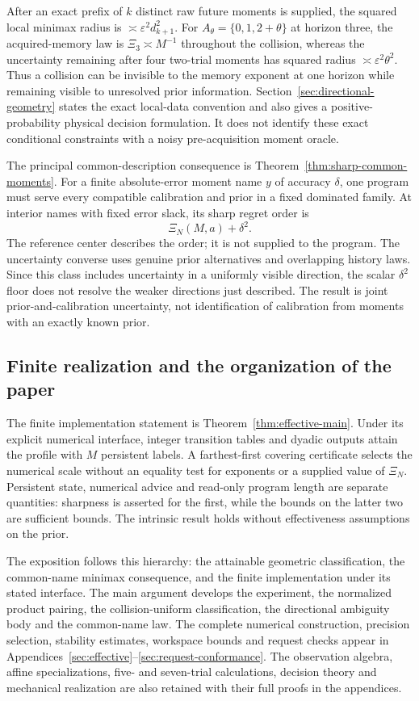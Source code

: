 After an exact prefix of $k$ distinct raw future moments is supplied,
the squared local minimax radius is
$\asymp\varepsilon^2d_{k+1}^2$. For
$A_\theta=\{0,1,2+\theta\}$ at horizon three, the acquired-memory law
is $\Xi_3\asymp M^{-1}$ throughout the collision, whereas the
uncertainty remaining after four two-trial moments has squared radius
$\asymp\varepsilon^2\theta^2$. Thus a collision can be invisible to
the memory exponent at one horizon while remaining visible to unresolved
prior information. Section~\ref{sec:directional-geometry} states the
exact local-data convention and also gives a positive-probability
physical decision formulation. It does not identify these exact
conditional constraints with a noisy pre-acquisition moment oracle.

The principal common-description consequence is
Theorem~\ref{thm:sharp-common-moments}. For a finite absolute-error
moment name $y$ of accuracy $\delta$, one program must serve every
compatible calibration and prior in a fixed dominated family. At
interior names with fixed error slack, its sharp regret order is
\[
 \Xi_N(M,a)+\delta^2.
\]
The reference center describes the order; it is not supplied to the
program. The uncertainty converse uses genuine prior alternatives and
overlapping history laws. Since this class includes uncertainty in a
uniformly visible direction, the scalar $\delta^2$ floor does not
resolve the weaker directions just described. The result is joint
prior-and-calibration uncertainty, not identification of calibration
from moments with an exactly known prior.

\subsection{Finite realization and the organization of the paper}
The finite implementation statement is Theorem~\ref{thm:effective-main}.
Under its explicit numerical interface, integer transition tables and
dyadic outputs attain the profile with $M$ persistent labels. A
farthest-first covering certificate selects the numerical scale without
an equality test for exponents or a supplied value of $\Xi_N$.
Persistent state, numerical advice and read-only program length are
separate quantities: sharpness is asserted for the first, while the
bounds on the latter two are sufficient bounds. The intrinsic result
holds without effectiveness assumptions on the prior.

The exposition follows this hierarchy: the attainable geometric
classification, the common-name minimax consequence, and the finite
implementation under its stated interface. The main argument develops
the experiment, the normalized product pairing, the collision-uniform
classification, the directional ambiguity body and the common-name law.
The complete numerical construction, precision selection, stability
estimates, workspace bounds and request checks appear in
Appendices~\ref{sec:effective}--\ref{sec:request-conformance}.
The observation algebra, affine specializations, five- and seven-trial
calculations, decision theory and mechanical realization are also
retained with their full proofs in the appendices.


